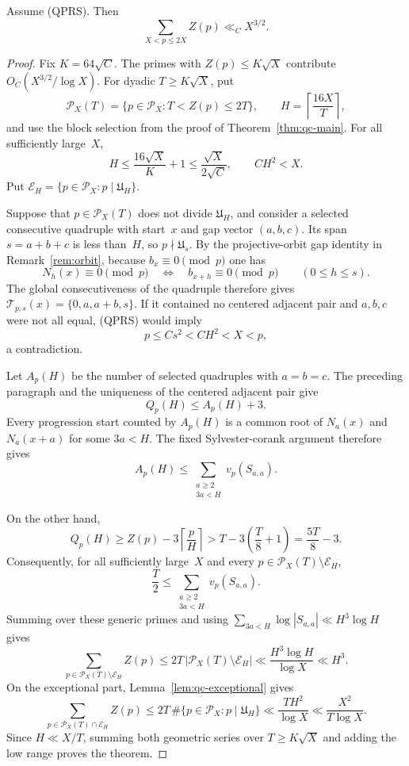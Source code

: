 \begin{theorem}
\label{thm:qc-qprs}
Assume \textup{(QPRS)}.  Then
\[
 \sum_{X<p\le2X}Z(p)\ll_C X^{3/2}.
\]
\end{theorem}

\begin{proof}
Fix $K=64\sqrt C$.  The primes with $Z(p)\le K\sqrt X$ contribute
$O_C(X^{3/2}/\log X)$.  For dyadic $T\ge K\sqrt X$, put
\[
 \mathcal P_X(T)=\{p\in\mathcal P_X:T<Z(p)\le2T\},
 \qquad H=\left\lceil\frac{16X}{T}\right\rceil,
\]
and use the block selection from the proof of
Theorem~\ref{thm:qc-main}.  For all sufficiently large~$X$,
\[
 H\le\frac{16\sqrt X}{K}+1
 \le\frac{\sqrt X}{2\sqrt C},
 \qquad CH^2<X.
\]
Put $\mathcal E_H=\{p\in\mathcal P_X:p\mid\mathfrak U_H\}$.

Suppose that $p\in\mathcal P_X(T)$ does not divide
$\mathfrak U_H$, and consider a selected consecutive quadruple with
start~$x$ and gap vector $(a,b,c)$.  Its span $s=a+b+c$ is less
than~$H$, so $p\nmid\mathfrak U_s$.  By the projective-orbit gap
identity in Remark~\ref{rem:orbit}, because $b_x\equiv0\pmod p$ one has
\[
 N_h(x)\equiv0\pmod p
 \quad\Longleftrightarrow\quad
 b_{x+h}\equiv0\pmod p
 \qquad(0\le h\le s).
\]
The global consecutiveness of the quadruple therefore gives
$\mathcal T_{p,s}(x)=\{0,a,a+b,s\}$.  If it contained no centered
adjacent pair and $a,b,c$ were not all equal,
\textup{(QPRS)} would imply
\[
 p\le Cs^2<CH^2<X<p,
\]
a contradiction.

Let $A_p(H)$ be the number of selected quadruples with $a=b=c$.
The preceding paragraph and the uniqueness of the centered adjacent pair
give
\[
 Q_p(H)\le A_p(H)+3.
\]
Every progression start counted by $A_p(H)$ is a common root of
$N_a(x)$ and $N_a(x+a)$ for some $3a<H$.  The fixed Sylvester-corank
argument therefore gives
\[
 A_p(H)\le\sum_{\substack{a\ge2\\3a<H}}v_p(S_{a,a}).
\]

On the other hand,
\[
 Q_p(H)\ge Z(p)-3\left\lceil\frac pH\right\rceil
 >T-3\left(\frac T8+1\right)
 =\frac{5T}{8}-3.
\]
Consequently, for all sufficiently large~$X$ and every
$p\in\mathcal P_X(T)\setminus\mathcal E_H$,
\[
 \frac T2\le\sum_{\substack{a\ge2\\3a<H}}v_p(S_{a,a}).
\]
Summing over these generic primes and using
$\sum_{3a<H}\log|S_{a,a}|\ll H^3\log H$ gives
\[
 \sum_{p\in\mathcal P_X(T)\setminus\mathcal E_H}Z(p)
 \le2T\,|\mathcal P_X(T)\setminus\mathcal E_H|
 \ll\frac{H^3\log H}{\log X}
 \ll H^3.
\]
On the exceptional part, Lemma~\ref{lem:qc-exceptional} gives
\[
 \sum_{p\in\mathcal P_X(T)\cap\mathcal E_H}Z(p)
 \le2T\,\#\{p\in\mathcal P_X:p\mid\mathfrak U_H\}
 \ll\frac{TH^2}{\log X}
 \ll\frac{X^2}{T\log X}.
\]
Since $H\ll X/T$, summing both geometric series over
$T\ge K\sqrt X$ and adding the low range proves the theorem.
\end{proof}

